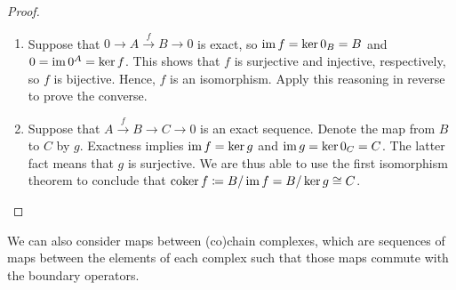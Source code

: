 \documentclass[a4paper,12pt]{article}
\begin{document}
\begin{proof} \leavevmode
    \begin{enumerate}
        \item Suppose that $0 \to A \xrightarrow{f} B \to 0$ is exact, so $\operatorname{im} f = \ker 0_B = B$ and $0 = \operatorname{im} 0^A = \ker f$.
              This shows that $f$ is surjective and injective, respectively, so $f$ is bijective.
              Hence, $f$ is an isomorphism.
              Apply this reasoning in reverse to prove the converse.
        \item Suppose that $A \xrightarrow{f} B \to C \to 0$ is an exact sequence.
              Denote the map from $B$ to $C$ by $g$.
              Exactness implies $\operatorname{im} f = \ker g$ and $\operatorname{im} g = \ker 0_C = C$.
              The latter fact means that $g$ is surjective.
              We are thus able to use the first isomorphism theorem to conclude that $\operatorname{coker} f \coloneq B / \operatorname{im} f = B / \ker g \cong C$. \qedhere
    \end{enumerate}
\end{proof}
We can also consider maps between (co)chain complexes, which are sequences of maps between the elements of each complex such that those maps commute with the boundary operators.
\end{document}
